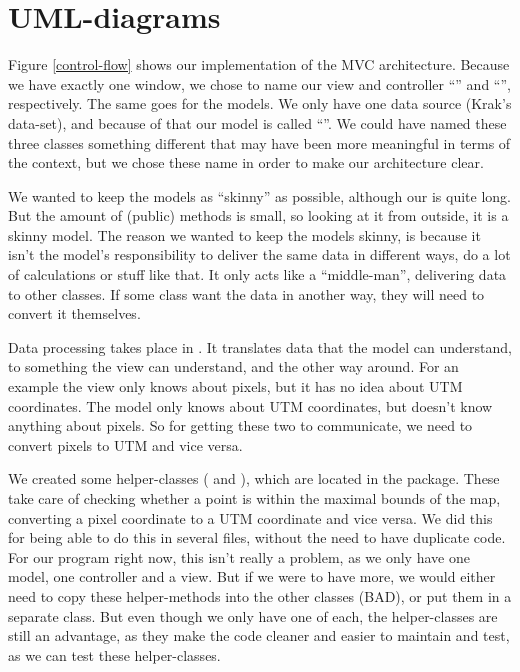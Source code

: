 \chapter{UML-diagrams}
\label{UML}

Figure \ref{control-flow} shows our implementation of the MVC architecture.
Because we have exactly one window, we chose to name our view and controller ``'' and 
``'', respectively. The same goes for the models. We only have one data 
source (Krak's data-set), and because of that our model is called ``''. We could 
have named these three classes something different that may have been more meaningful 
in terms of the  context, but we chose these name in order to make 
our architecture clear.

We wanted to keep the models as ``skinny'' as possible, 
although our  is quite long. But the amount of (public) methods is small, so 
looking at it from outside, it is a skinny model. The reason we wanted to keep the models 
skinny, is because it isn't the model's responsibility to deliver the same data in different ways, 
do a lot of calculations or stuff like that. It only acts like a ``middle-man'', delivering data to 
other classes. If some class want the data in another way, they will need to convert it 
themselves.

Data processing takes place in . It translates data that the model can 
understand, to something the view can understand, and the other way around. For 
an example the view only knows about pixels, but it has no idea about UTM 
coordinates. The model only knows about UTM coordinates, but doesn't know anything 
about pixels. So for getting these two to communicate, we need to convert pixels to 
UTM and vice versa.

We created some helper-classes ( and ), 
which are located in the  package. These take care of checking whether a point 
is within the maximal bounds of the map, converting a pixel coordinate to a UTM coordinate 
and vice versa. We did this for being able to do this in several files, without the need to have 
duplicate code. For our program right now, this isn't really a problem, as we only have one 
model, one controller and a view. But if we were to have more, we would either need to copy 
these helper-methods into the other classes (BAD), or put them in a separate class. But even 
though we only have one of each, the helper-classes are still an advantage, as
they make the code cleaner and easier to maintain and test, as we can test these helper-classes.

